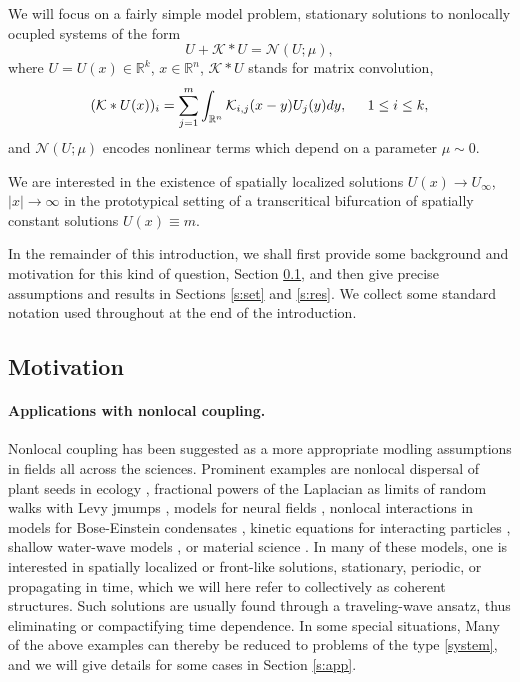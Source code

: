 \documentclass[10pt]{article}
\newcommand{\R}{\mathbb{R}}
\newcommand{\Nl}{\mathcal{N}}
\newcommand{\K}{\mathcal{K}}
\begin{document}
We will focus on a fairly simple model problem, stationary solutions to nonlocally ocupled systems of the form
\begin{equation} \label{system}
U+\K\ast U = \Nl(U;\mu) ,
\end{equation}
where $U=U(x)\in\R^k$, $x\in\R^n$, $\K\ast U$ stands for matrix convolution,
\[
(\K\ast U(x))_i = \sum_{j=1}^m \int_{\R^n} \K_{i,j}(x-y)U_j(y)dy, \hspace{0.2in} 1\le i\le k,
\]
and $\Nl(U;\mu)$ encodes nonlinear terms which depend on a parameter $\mu\sim 0$. 

We are interested in the existence of spatially localized solutions $U(x)\to U_\infty$, $|x|\to\infty$ in the  prototypical setting of a transcritical bifurcation of spatially constant solutions $U(x)\equiv m$. 

In the remainder of this introduction, we shall first provide some background and motivation for this kind of question, Section \ref{s:mot}, and then give precise assumptions and results in Sections \ref{s:set} and \ref{s:res}. We collect some standard notation used throughout at the end of the introduction. 


\subsection{Motivation}\label{s:mot}

\paragraph{Applications with nonlocal coupling.} Nonlocal coupling has been suggested as a more appropriate modling assumptions in fields all across the sciences. Prominent examples are nonlocal dispersal of plant seeds in ecology \cite{plantdisp}, fractional powers of the Laplacian as limits of random walks with Levy jmumps \cite{levy}, models for neural fields \cite{neuralfieldrev}, nonlocal interactions in models for Bose-Einstein condensates \cite{bose}, kinetic equations for interacting particles \cite{swarmingrev}, shallow water-wave models \cite{waterwave}, or material science \cite{matsci}. In many of these models, one is interested in spatially localized or front-like solutions, stationary, periodic,  or  propagating in time,  which we will here refer to collectively as  coherent structures. Such solutions are usually found through a traveling-wave ansatz, thus eliminating or compactifying time dependence.  In some special situations, Many of the above examples can thereby be reduced to problems of the type \eqref{system}, and we will give details for some cases in Section \ref{s:app}. 
\end{document}
